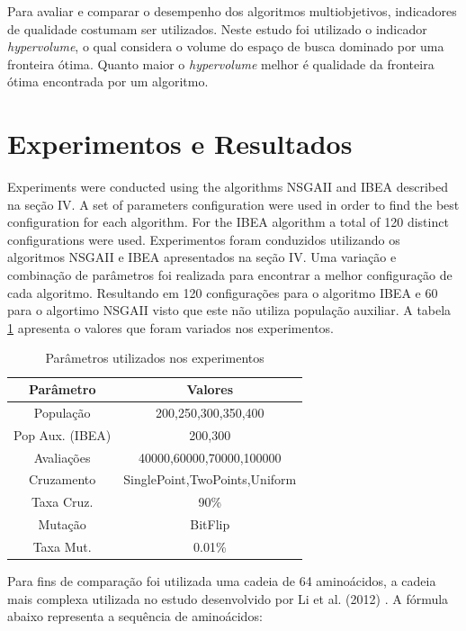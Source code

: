 \documentclass[conference]{IEEEtran}
\begin{document}
Para  avaliar e comparar o desempenho dos algoritmos multiobjetivos, indicadores de qualidade costumam ser utilizados. Neste estudo foi utilizado o indicador \textit{hypervolume}, o qual considera o volume do espaço de busca dominado por uma fronteira ótima\cite{zitzler2003performance}. Quanto maior o \textit{hypervolume} melhor é qualidade da fronteira ótima encontrada por um algoritmo.

\section{Experimentos e Resultados}

Experiments were conducted using the algorithms NSGAII and IBEA described na seção IV. A set of parameters configuration were used in order to find the best configuration for each algorithm. For the IBEA algorithm a total of 120 distinct configurations were used.
Experimentos foram conduzidos utilizando os algoritmos NSGAII e IBEA apresentados na seção IV. Uma variação e combinação de parâmetros foi realizada para encontrar a melhor configuração de cada algoritmo. Resultando em 120 configurações para o algoritmo IBEA e 60 para o algortimo NSGAII visto que este não utiliza população auxiliar. A tabela \ref{tab:tuning} apresenta o  valores que foram variados nos experimentos.

\begin{table}[h]
	\centering
	\caption{Parâmetros utilizados nos experimentos}
	\label{tab:tuning}
	\begin{tabular}{|c|c|}
		\hline
		{\bf Parâmetro} & {\bf Valores}                 \\ \hline
		População       & 200,250,300,350,400           \\
		\hline
		Pop Aux. (IBEA)        & 200,300                       \\ \hline
		Avaliações      & 40000,60000,70000,100000      \\ \hline
		Cruzamento      & SinglePoint,TwoPoints,Uniform \\ \hline
		Taxa Cruz.      & 90\%                          \\ \hline
		Mutação         & BitFlip                       \\ \hline
		Taxa Mut.       & 0.01\%                        \\ \hline
	\end{tabular}
\end{table}

Para fins de comparação foi utilizada uma cadeia de 64 aminoácidos, a cadeia mais complexa utilizada no estudo desenvolvido por Li et al. (2012) \cite{li2012genetic}. A fórmula abaixo representa a sequência de aminoácidos:  
\\
\\
\begin{small}
	\noindent {} 
\end{small}
\\
\end{document}
